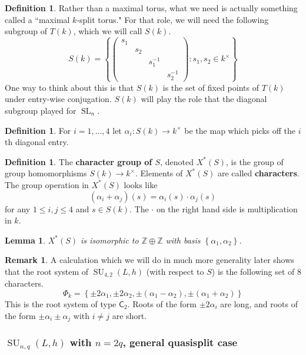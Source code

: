\documentclass[12pt]{article}
\newtheorem{lemma}[theorem]{Lemma}
\theoremstyle{definition}
\newtheorem{definition}[theorem]{Definition}
\newtheorem{remark}[theorem]{Remark}
\numberwithin{theorem}{subsection}
\newcommand{\Z}{\mathbb{Z}}
\newcommand{\lb}{\left\{}
\newcommand{\rb}{\right\}}
\newcommand{\tbf}{\textbf}
\newcommand{\inv}{^{-1}}
\DeclareMathOperator{\SL}{SL}
\DeclareMathOperator{\SU}{SU}
\begin{document}
\begin{definition}
Rather than a maximal torus, what we need is actually something called a ``maximal $k$-split torus." For that role, we will need the following subgroup of $T(k)$, which we will call $S(k)$.
\[
	S(k) = 
	\lb
	\begin{pmatrix}
		s_1 \\
		& s_2 \\
		&& s_1 \inv \\
		&&& s_2 \inv
	\end{pmatrix}
	: s_1, s_2 \in k^\times
	\rb
\]
One way to think about this is that $S(k)$ is the set of fixed points of $T(k)$ under entry-wise conjugation. $S(k)$ will play the role that the diagonal subgroup played for $\SL_n$.
\end{definition}

\begin{definition}
For $i = 1, \ldots, 4$ let $\alpha_i:S(k) \to k^\times$ be the map which picks off the $i$th diagonal entry.
\end{definition}

\begin{definition}
The \tbf{character group of $S$}, denoted $X^*(S)$, is the group of group homomorphisms $S(k) \to k^\times$. Elements of $X^*(S)$ are called \tbf{characters}. The group operation in $X^*(S)$ looks like
\[
	(\alpha_i + \alpha_j) (s) = \alpha_i(s) \cdot \alpha_j(s)
\]
for any $1 \le i,j \le 4$ and $s \in S(k)$. The $\cdot$ on the right hand side is multiplication in $k$.
\end{definition}

\begin{lemma}
$X^*(S)$ is isomorphic to $\Z \oplus \Z$ with basis $\lb \alpha_1, \alpha_2 \rb$.
\end{lemma}

\begin{remark}
A calculation which we will do in much more generality later shows that the root system of $\SU_{4,2}(L,h)$ (with respect to $S$) is the following set of 8 characters.
\[
	\Phi_k = \lb \pm 2 \alpha_1, \pm 2\alpha_2, \pm (\alpha_1 - \alpha_2), \pm (\alpha_1 + \alpha_2) \rb
\]
This is the root system of type $\mathsf{C}_2$. Roots of the form $\pm 2 \alpha_i$ are long, and roots of the form $\pm \alpha_i \pm \alpha_j$ with $i \neq j$ are short. 
\end{remark}

\subsubsection{$\SU_{n,q}(L,h)$ with $n=2q$, general quasisplit case}
\label{SU2n maximal}
\end{document}
